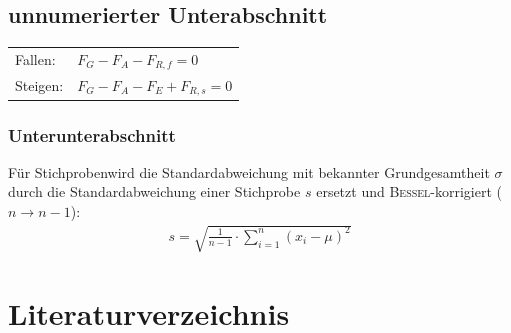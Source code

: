 \documentclass[a4paper,fleqn]{article}
\begin{document}
\subsection*{unnumerierter Unterabschnitt}
\begin{tabular}{ll}
	Fallen: & $F_G - F_A - F_{R,f} = 0$ \\
	Steigen: & $F_G - F_A - F_E + F_{R,s} = 0$
\end{tabular} 
\newline

\subsubsection{Unterunterabschnitt}
Für Stichproben\footnotemark \space wird die Standardabweichung mit bekannter Grundgesamtheit $\sigma$ durch die Standardabweichung einer Stichprobe $s$ ersetzt und \textsc{Bessel}\footnotemark-korrigiert ($n \rightarrow n-1$)\cite{oA:2022:bk}:
\begin{align}
	s = \sqrt{\frac{1}{n-1}\cdot \sum _{i=1}^{n} \left(x_i-\mu\right)^2}
\end{align}

\newpage
\appendix
\section{Literaturverzeichnis}
\printbibliography
\end{document}
